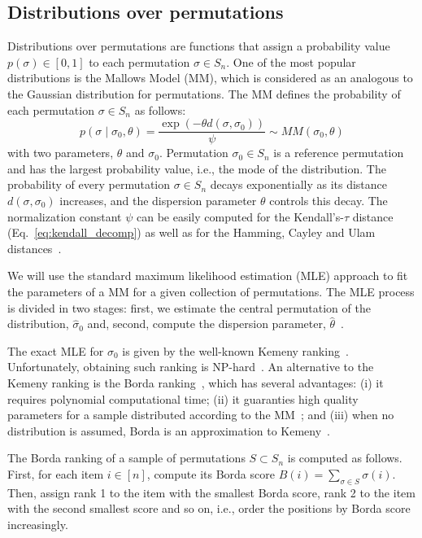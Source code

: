 \documentclass[sigconf,dvipsnames]{acmart}
\newcommand{\Prob}{\ensuremath{p}}
\begin{document}
\subsection{Distributions over permutations}
Distributions over permutations are functions that assign a probability value  $\Prob(\sigma)\in[0,1]$ to each permutation $\sigma \in S_n$. One of the most popular distributions is the Mallows Model (MM), which is considered as an analogous to the Gaussian distribution for permutations. The MM defines the probability of each permutation $\sigma\in S_n$ as follows:
%
\begin{equation}\label{eq:MM}
\Prob(\sigma \mid \sigma_0, \theta )= \frac{\exp(-\theta d(\sigma, \sigma_0))}{\psi} \sim MM(\sigma_0, \theta)
\end{equation}
%
with two parameters, $\theta$ and $\sigma_0$. Permutation $\sigma_0\in S_n$ is a reference permutation and has the largest probability value, i.e., the mode of the distribution. The probability of every permutation $\sigma\in S_n$ decays exponentially as its distance $d(\sigma,\sigma_0)$ increases, and the dispersion parameter $\theta$  controls this decay.  The normalization constant $\psi$ can be easily computed for the Kendall's-$\tau$ distance (Eq.~\ref{eq:kendall_decomp}) as well as for the Hamming, Cayley and Ulam distances~\cite{IruCalLoz2016permallows}.


We will use the standard maximum likelihood estimation (MLE) approach to fit the parameters of a MM for a given collection of permutations. 
The MLE process is divided in two stages: first, we estimate the central permutation of the distribution, $\hat{\sigma}_0$ and, second, compute the dispersion parameter, $\hat\theta$~\cite{IruCalLoz2016permallows}. 

The exact MLE for $\sigma_0$ is given by the well-known Kemeny ranking~\cite{DwoKumNao2001rank}. Unfortunately,  obtaining such ranking is NP-hard~\cite{DwoKumNao2001rank}. An alternative to the Kemeny ranking is the Borda ranking~\cite{AliMei2011kemeny}, which has several advantages: (i) it requires polynomial computational time; (ii) it  guaranties  high quality parameters for a sample distributed according to the MM~\cite{CarProSha2013votes}; and (iii) when no distribution is assumed, Borda is an approximation to Kemeny~\cite{CopFleRur2010ordering}.

The Borda ranking of a sample of permutations $S \subset S_n$ is computed as follows. 
First, for each item $i \in [n]$, compute its Borda score $B(i) =  \sum_{\sigma\in S}  \sigma(i)$. Then, assign rank 1 to the item with the smallest Borda score, rank 2 to the item with the second smallest score and so on, i.e., order the positions by Borda score increasingly.
\end{document}
